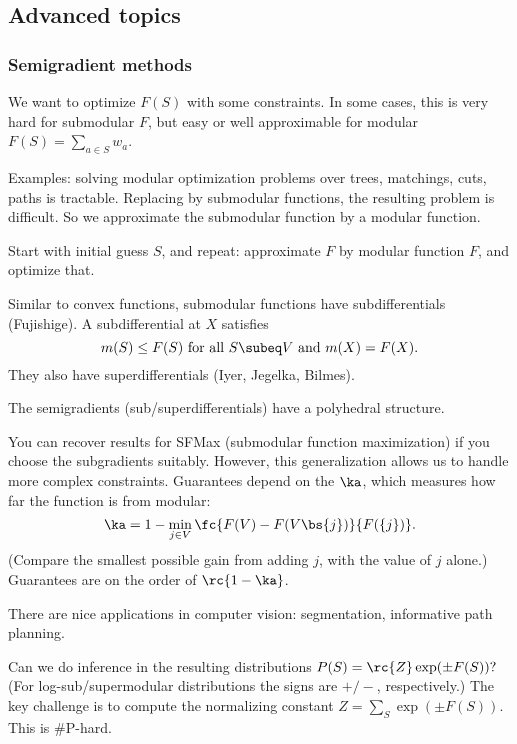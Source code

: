 

\subsection{Advanced topics}

\subsubsection{Semigradient methods}
We want to optimize $F(S)$ with some constraints. In some cases, this is very hard for submodular $F$, but easy or well approximable for modular $F(S) = \sum_{a\in S} w_a$.

Examples: solving modular optimization problems over trees, matchings, cuts, paths  is tractable. %
Replacing by submodular functions, the resulting problem is difficult.
So we approximate the submodular function by a  modular function.

Start with initial guess $S$, and repeat: approximate $F$ by modular function $F$, and optimize that.

Similar to convex functions, submodular functions have subdifferentials (Fujishige). A subdifferential at $X$ satisfies
$$
m(S) \le F(S) \text{ for all }S\subeq V\text{ and }m(X)=F(X).
$$
They also have superdifferentials (Iyer, Jegelka, Bilmes).

The semigradients (sub/superdifferentials) have a polyhedral structure.

You can recover results for SFMax (submodular function maximization) if you choose the subgradients suitably. However, this generalization allows us to handle more complex constraints. Guarantees depend on the  $\ka$, which measures how far the function is from modular:
$$\ka = 
1-\min_{j\in V}\fc{F(V)-F(V\bs\{j\})}{F(\{j\})}.
$$
(Compare the smallest possible gain from adding $j$, with the value of $j$ alone.) Guarantees are on the order of $\rc{1-\ka}$.

There are nice applications in computer vision: segmentation, informative path planning.

Can we do inference in the resulting distributions $P(S) = \rc{Z} \exp(\pm F(S))?$
(For log-sub/supermodular distributions the signs are $+/-$, respectively.)
The key challenge is to compute the normalizing constant $Z=\sum_S\exp(\pm F(S))$. This is $\#$P-hard. 

